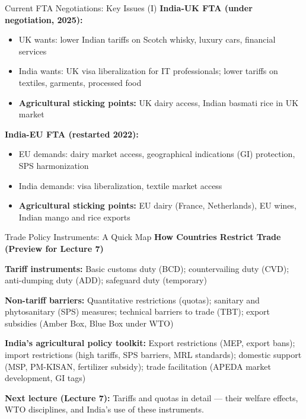 \documentclass[
  ignorenonframetext,
  aspectratio=169,
]{beamer}
\makeatletter
\providecommand{\tightlist}{%
  \setlength{\itemsep}{0pt}\setlength{\parskip}{0pt}}
\let\quarto@originallabel\label
\DeclareRobustCommand*{\label}[1]{\quarto@originallabel{#1}}
\makeatother
\begin{document}
\begin{frame}{Current FTA Negotiations: Key Issues (I)}
\label{current-fta-negotiations-key-issues-i}
\textbf{India-UK FTA (under negotiation, 2025):}

\begin{itemize}
\tightlist
\item
  UK wants: lower Indian tariffs on Scotch whisky, luxury cars,
  financial services
\item
  India wants: UK visa liberalization for IT professionals; lower
  tariffs on textiles, garments, processed food
\item
  \textbf{Agricultural sticking points:} UK dairy access, Indian basmati
  rice in UK market
\end{itemize}

\textbf{India-EU FTA (restarted 2022):}

\begin{itemize}
\tightlist
\item
  EU demands: dairy market access, geographical indications (GI)
  protection, SPS harmonization
\item
  India demands: visa liberalization, textile market access
\item
  \textbf{Agricultural sticking points:} EU dairy (France, Netherlands),
  EU wines, Indian mango and rice exports
\end{itemize}

\end{frame}

\begin{frame}{Trade Policy Instruments: A Quick Map}
\label{trade-policy-instruments-a-quick-map}
\textbf{How Countries Restrict Trade (Preview for Lecture 7)}

\textbf{Tariff instruments:} Basic customs duty (BCD); countervailing
duty (CVD); anti-dumping duty (ADD); safeguard duty (temporary)

\textbf{Non-tariff barriers:} Quantitative restrictions (quotas);
sanitary and phytosanitary (SPS) measures; technical barriers to trade
(TBT); export subsidies (Amber Box, Blue Box under WTO)

\textbf{India's agricultural policy toolkit:} Export restrictions (MEP,
export bans); import restrictions (high tariffs, SPS barriers, MRL
standards); domestic support (MSP, PM-KISAN, fertilizer subsidy); trade
facilitation (APEDA market development, GI tags)

\textbf{Next lecture (Lecture 7):} Tariffs and quotas in detail ---
their welfare effects, WTO disciplines, and India's use of these
instruments.
\end{frame}
\end{document}
